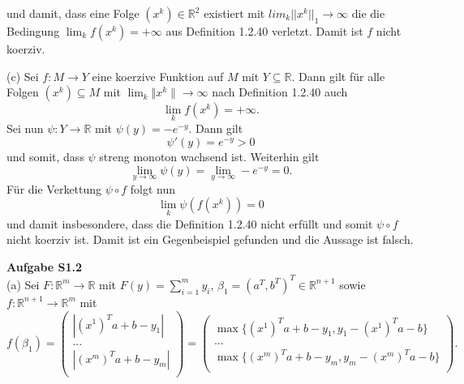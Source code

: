 \documentclass[ngerman, a4paper,12pt]{article}
\begin{document}
und damit, dass eine Folge $(x^k) \in \mathbb{R}^2$ existiert mit $lim_k ||x^k||_1 \rightarrow \infty$ die die Bedingung $\lim_k f(x^k) = + \infty$ aus Definition 1.2.40 verletzt. Damit ist $f$ nicht koerziv. \par
(c) Sei $f: M \rightarrow Y$ eine koerzive Funktion auf $M$ mit $Y \subseteq \mathbb{R}$. Dann gilt für alle Folgen $(x^k) \subseteq M$ mit $\lim_{k} \Vert x^k \| \rightarrow \infty$ nach Definition 1.2.40 auch
\begin{equation*}
\lim\limits_{k} f(x^k) = + \infty .
\end{equation*}
Sei nun $\psi : Y \rightarrow \mathbb{R}$  mit $\psi (y) = -e^{-y}$. Dann gilt
\begin{equation*}
\psi ' (y) = e^{-y} > 0
\end{equation*}
und somit, dass $\psi$ streng monoton wachsend ist. Weiterhin gilt 
\begin{equation}
\lim_{y \rightarrow \infty} \psi(y) = \lim_{y \rightarrow \infty} -e^{-y} = 0.
\end{equation}
Für die Verkettung $\psi \circ f$ folgt nun
\begin{equation}
\lim\limits_{k} \psi(f(x^k)) = 0
\end{equation}
und damit insbesondere, dass die Definition 1.2.40 nicht erfüllt und somit $\psi \circ f$ nicht koerziv ist. Damit ist ein Gegenbeispiel gefunden und die Aussage ist falsch. \par
\textbf{Aufgabe S1.2} \\
(a) Sei $F: \mathbb{R}^m \rightarrow \mathbb{R}$ mit $F(y) = \sum_{i=1}^{m}y_i$, $\beta_1 = (a^T, b^T)^T \in \mathbb{R}^{n+1}$ sowie $f: \mathbb{R}^{n+1} \rightarrow \mathbb{R}^m$ mit 
\begin{equation*}
	f(\beta_1) = 
					\begin{pmatrix}
					\left| (x^1)^Ta + b - y_1 \right| \\
					... \\
					\left| (x^m)^Ta + b - y_m \right| \\
					 \end{pmatrix} =
											 \begin{pmatrix}
											 \max\{(x^1)^Ta + b - y_1 , y_1 - (x^1)^Ta - b\} \\
											 ... \\
											 \max\{(x^m)^Ta + b - y_m , y_m - (x^m)^Ta - b\} \\
											 \end{pmatrix}.
\end{equation*}
\end{document}
